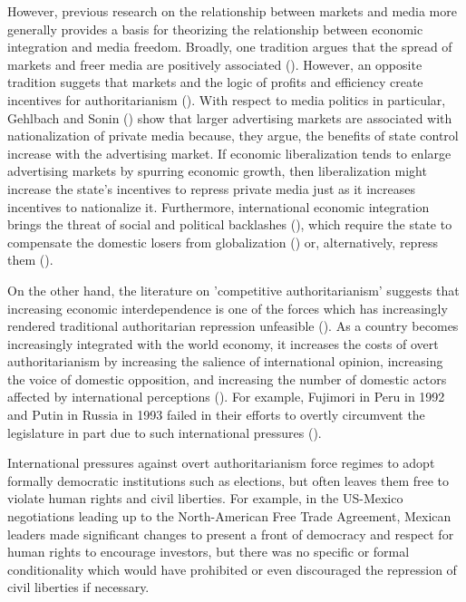\documentclass[12pt]{report}
\begin{document}
However, previous research on the relationship between markets and media more generally provides a
basis for theorizing the relationship between economic integration and media freedom. Broadly, one
tradition argues that the spread of markets and freer media are positively associated
(\citealt{Habermas:1991vg,Islam:2002uc,Islam:2003tu}). However, an opposite tradition suggets that
markets and the logic of profits and efficiency create incentives for authoritarianism
(\citealt{Huntington:1975vt}). With respect to media politics in particular, Gehlbach and Sonin
(\citeyear{Gehlbach:2011ky}) show that larger advertising markets are associated with
nationalization of private media because, they argue, the benefits of state control increase with
the advertising market. If economic liberalization tends to enlarge advertising markets by spurring
economic growth, then liberalization might increase the state's incentives to repress private media
just as it increases incentives to nationalize it. Furthermore, international economic integration
brings the threat of social and political backlashes (\citealt{Bussmann:2007vx}), which require the
state to compensate the domestic losers from globalization (\citealt{Rodrik:1998te}) or,
alternatively, repress them (\citealt{Adsera:2002vt}).

On the other hand, the literature on 'competitive authoritarianism' suggests that increasing
economic interdependence is one of the forces which has increasingly rendered traditional
authoritarian repression unfeasible (\citealt[60, 62]{Levitsky:2002gx}). As a country becomes
increasingly integrated with the world economy, it increases the costs of overt authoritarianism by
increasing the salience of international opinion, increasing the voice of domestic opposition, and
increasing the number of domestic actors affected by international perceptions
(\citealt{Levitsky:2006ex}). For example, Fujimori in Peru in 1992 and Putin in Russia in 1993
failed in their efforts to overtly circumvent the legislature in part due to such international
pressures (\citealt[56]{Levitsky:2002gx}).

International pressures against overt authoritarianism force regimes to adopt formally democratic
institutions such as elections, but often leaves them free to violate human rights and civil
liberties. For example, in the US-Mexico negotiations leading up to the North-American Free Trade
Agreement, Mexican leaders made significant changes to present a front of democracy and respect for
human rights to encourage investors, but there was no specific or formal conditionality which would
have prohibited or even discouraged the repression of civil liberties if necessary.
\end{document}
